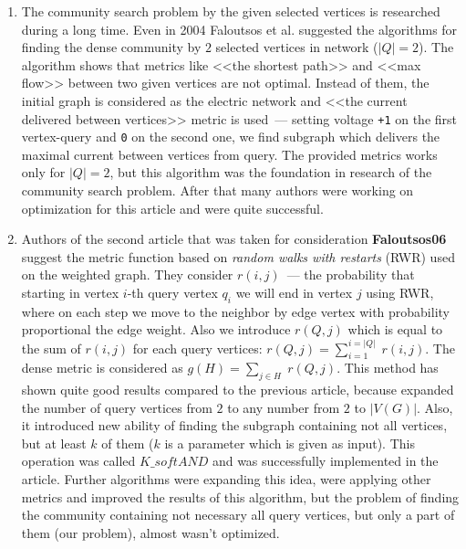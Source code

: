 \begin{enumerate}
  \item The community search problem by the given selected vertices is researched during a long time. Even in 2004 Faloutsos et al. \cite{Faloutsos04} suggested the algorithms for finding the dense community by $2$ selected vertices in network ($|Q| = 2$). The algorithm shows that metrics like <<the shortest path>> and <<max flow>> between two given vertices are not optimal. Instead of them, the initial graph is considered as the electric network and <<the current delivered between vertices>> metric is used~--- setting voltage \texttt{+1} on the first vertex-query and \texttt{0} on the second one, we find subgraph which delivers the maximal current between vertices from query. The provided metrics works only for $|Q| = 2$, but this algorithm was the foundation in research of the community search problem. After that many authors were working on optimization for this article and were quite successful.

  \item Authors of the second article that was taken for consideration \textbf{Faloutsos06} suggest the metric function based on \textit{random walks with restarts} (RWR) used on the weighted graph. They consider $r(i, j)$~--- the probability that starting in vertex $i$-th query vertex $q_i$ we will end in vertex $j$ using RWR, where on each step we move to the neighbor by edge vertex with probability proportional the edge weight. Also we introduce $r(Q, j)$ which is equal to the sum of $r(i, j)$ for each query vertices: $r(Q, j) = \sum_{i = 1}^{i = |Q|}\; r(i, j)$. The dense metric is considered as $g(H) = \sum_{j \in H}\; r(Q, j)$. This method has shown quite good results compared to the previous article, because expanded the number of query vertices from $2$ to any number from $2$ to $|V(G)|$. Also, it introduced new ability of finding the subgraph containing not all vertices, but at least $k$ of them ($k$ is a parameter which is given as input). This operation was called $K\_softAND$ and was successfully implemented in the article. Further algorithms were expanding this idea, were applying other metrics and improved the results of this algorithm, but the problem of finding the community containing not necessary all query vertices, but only a part of them (our problem), almost wasn't optimized.


\end{enumerate}

